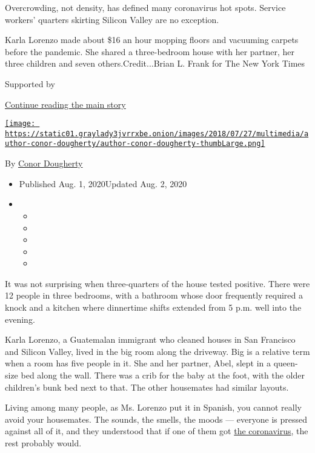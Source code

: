 Overcrowding, not density, has defined many coronavirus hot spots.
Service workers' quarters skirting Silicon Valley are no exception.

Karla Lorenzo made about \$16 an hour mopping floors and vacuuming
carpets before the pandemic. She shared a three-bedroom house with her
partner, her three children and seven others.Credit...Brian L. Frank for
The New York Times

Supported by

\protect\hyperlink{after-sponsor}{Continue reading the main story}

\href{https://www.nytimes3xbfgragh.onion/by/conor-dougherty}{\texttt{[image: https://static01.graylady3jvrrxbe.onion/images/2018/07/27/multimedia/author-conor-dougherty/author-conor-dougherty-thumbLarge.png]}}

By \href{https://www.nytimes3xbfgragh.onion/by/conor-dougherty}{Conor
Dougherty}

\begin{itemize}
\item
  Published Aug. 1, 2020Updated Aug. 2, 2020
\item
  \begin{itemize}
  \item
  \item
  \item
  \item
  \item
  \end{itemize}
\end{itemize}

It was not surprising when three-quarters of the house tested positive.
There were 12 people in three bedrooms, with a bathroom whose door
frequently required a knock and a kitchen where dinnertime shifts
extended from 5 p.m. well into the evening.

Karla Lorenzo, a Guatemalan immigrant who cleaned houses in San
Francisco and Silicon Valley, lived in the big room along the driveway.
Big is a relative term when a room has five people in it. She and her
partner, Abel, slept in a queen-size bed along the wall. There was a
crib for the baby at the foot, with the older children's bunk bed next
to that. The other housemates had similar layouts.

Living among many people, as Ms. Lorenzo put it in Spanish, you cannot
really avoid your housemates. The sounds, the smells, the moods ---
everyone is pressed against all of it, and they understood that if one
of them got
\href{https://www.nytimes3xbfgragh.onion/news-event/coronavirus}{the
coronavirus}, the rest probably would.

